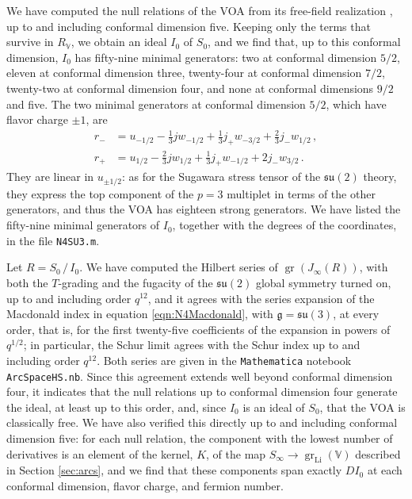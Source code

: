 \documentclass[12pt]{article}
\numberwithin{equation}{section}
\numberwithin{figure}{section}
\theoremstyle{plain}
\theoremstyle{definition}
\begin{document}
We have computed the null relations of the VOA from its free-field realization \cite{Bonetti:2018fqz}, up to and including conformal dimension five. Keeping only the terms that survive in $R_\mathbb{V}$, we obtain an ideal $I_0$ of $S_0$, and we find that, up to this conformal dimension, $I_0$ has fifty-nine minimal generators: two at conformal dimension $5/2$, eleven at conformal dimension three, twenty-four at conformal dimension $7/2$, twenty-two at conformal dimension four, and none at conformal dimensions $9/2$ and five. The two minimal generators at conformal dimension $5/2$, which have flavor charge $\pm 1$, are
\begin{equation}\label{eqn:N4SU3r}
  \begin{aligned}
    r_- &= u_{-1/2} - \frac{1}{3} j w_{-1/2} + \frac{1}{3} j_+ w_{-3/2} + \frac{2}{3} j_- w_{1/2} \,, \\
    r_+ &= u_{1/2} - \frac{2}{3} j w_{1/2} + \frac{1}{3} j_+ w_{-1/2} + 2 j_- w_{3/2} \,.
  \end{aligned}
\end{equation}
They are linear in $u_{\pm 1/2}$: as for the Sugawara stress tensor of the $\mathfrak{su}(2)$ theory, they express the top component of the $p = 3$ multiplet in terms of the other generators, and thus the VOA has eighteen strong generators. We have listed the fifty-nine minimal generators of $I_0$, together with the degrees of the coordinates, in the file {\tt N4SU3.m}.

Let $R = S_0 \, / \, I_0$. We have computed the Hilbert series of $\operatorname{gr}(J_\infty(R))$, with both the $T$-grading and the fugacity of the $\mathfrak{su}(2)$ global symmetry turned on, up to and including order $q^{12}$, and it agrees with the series expansion of the Macdonald index in equation \eqref{eqn:N4Macdonald}, with $\mathfrak{g} = \mathfrak{su}(3)$, at every order, that is, for the first twenty-five coefficients of the expansion in powers of $q^{1/2}$; in particular, the Schur limit agrees with the Schur index up to and including order $q^{12}$. Both series are given in the {\tt Mathematica} notebook {\tt ArcSpaceHS.nb}. Since this agreement extends well beyond conformal dimension four, it indicates that the null relations up to conformal dimension four generate the ideal, at least up to this order, and, since $I_0$ is an ideal of $S_0$, that the VOA is classically free. We have also verified this directly up to and including conformal dimension five: for each null relation, the component with the lowest number of derivatives is an element of the kernel, $K$, of the map $S_\infty \rightarrow \operatorname{gr}_{\operatorname{Li}}(\mathbb{V})$ described in Section \ref{sec:arcs}, and we find that these components span exactly $DI_0$ at each conformal dimension, flavor charge, and fermion number.
\end{document}
